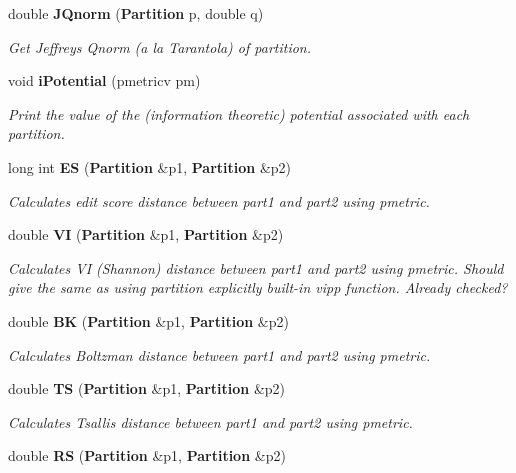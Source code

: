 \begin{CompactItemize}
\item 
double {\bf JQnorm} ({\bf Partition} p, double q)\label{classPartitionStats_a30}

\begin{CompactList}\small\item\em Get Jeffreys Qnorm (a la Tarantola) of partition. \item\end{CompactList}\item 
void {\bf i\-Potential} (pmetricv pm)\label{classPartitionStats_a31}

\begin{CompactList}\small\item\em Print the value of the (information theoretic) potential associated with each partition. \item\end{CompactList}\item 
long int {\bf ES} ({\bf Partition} \&p1, {\bf Partition} \&p2)\label{classPartitionStats_a32}

\begin{CompactList}\small\item\em Calculates edit score distance between part1 and part2 using pmetric. \item\end{CompactList}\item 
double {\bf VI} ({\bf Partition} \&p1, {\bf Partition} \&p2)\label{classPartitionStats_a33}

\begin{CompactList}\small\item\em Calculates VI (Shannon) distance between part1 and part2 using pmetric. Should give the same as using partition explicitly built-in vipp function. Already checked? \item\end{CompactList}\item 
double {\bf BK} ({\bf Partition} \&p1, {\bf Partition} \&p2)\label{classPartitionStats_a34}

\begin{CompactList}\small\item\em Calculates Boltzman distance between part1 and part2 using pmetric. \item\end{CompactList}\item 
double {\bf TS} ({\bf Partition} \&p1, {\bf Partition} \&p2)\label{classPartitionStats_a35}

\begin{CompactList}\small\item\em Calculates Tsallis distance between part1 and part2 using pmetric. \item\end{CompactList}\item 
double {\bf RS} ({\bf Partition} \&p1, {\bf Partition} \&p2)\label{classPartitionStats_a36}


\end{CompactItemize}
